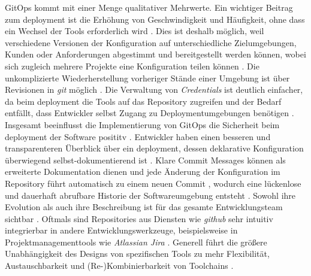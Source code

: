 GitOps kommt mit einer Menge qualitativer Mehrwerte. Ein wichtiger Beitrag zum \Gls{deployment} ist die Erhöhung von Geschwindigkeit und Häufigkeit, ohne dass ein Wechsel der Tools erforderlich wird \cite{008:GitOps-Approach-to-Cloud-Cluster-System-Deployment,109:GitOps}. Dies ist deshalb möglich, weil verschiedene Versionen der Konfiguration auf unterschiedliche Zielumgebungen, Kunden oder Anforderungen abgestimmt und bereitgestellt werden können, wobei sich zugleich mehrere Projekte eine Konfiguration teilen können \cite{008:GitOps-Approach-to-Cloud-Cluster-System-Deployment}. Die unkomplizierte Wiederherstellung vorheriger Stände einer Umgebung ist über Revisionen in \textit{\Gls{git}} möglich \cite{008:GitOps-Approach-to-Cloud-Cluster-System-Deployment,010:Efficient-Application-Deployment-GitOps-for-Faster-and-Secure-CI-CD-Cycles,109:GitOps}. Die Verwaltung von \textit{Credentials} ist deutlich einfacher, da beim \Gls{deployment} die Tools auf das Repository zugreifen \cite{008:GitOps-Approach-to-Cloud-Cluster-System-Deployment,109:GitOps} und der Bedarf entfällt, dass Entwickler selbst Zugang zu Deploymentumgebungen benötigen \cite{010:Efficient-Application-Deployment-GitOps-for-Faster-and-Secure-CI-CD-Cycles}. Insgesamt beeinflusst die Implementierung von GitOps die Sicherheit beim \Gls{deployment} der Software posititv \cite{008:GitOps-Approach-to-Cloud-Cluster-System-Deployment,010:Efficient-Application-Deployment-GitOps-for-Faster-and-Secure-CI-CD-Cycles,109:GitOps}. Entwickler haben einen besseren und transparenteren Überblick über ein \Gls{deployment}, dessen deklarative Konfiguration überwiegend selbst-dokumentierend ist \cite{008:GitOps-Approach-to-Cloud-Cluster-System-Deployment,109:GitOps}. Klare Commit Messages können als erweiterte Dokumentation dienen \cite{008:GitOps-Approach-to-Cloud-Cluster-System-Deployment} und jede Änderung der Konfiguration im Repository führt automatisch zu einem neuen Commit \cite{010:Efficient-Application-Deployment-GitOps-for-Faster-and-Secure-CI-CD-Cycles}, wodurch eine lückenlose und dauerhaft abrufbare Historie der Softwareumgebung entsteht \cite{008:GitOps-Approach-to-Cloud-Cluster-System-Deployment,010:Efficient-Application-Deployment-GitOps-for-Faster-and-Secure-CI-CD-Cycles,109:GitOps}. Sowohl ihre Evolution als auch ihre Beschreibung ist für das gesamte Entwicklungsteam sichtbar \cite{109:GitOps}. Oftmals sind Repositories aus Diensten wie \textit{\Gls{github}} sehr intuitiv integrierbar in andere Entwicklungswerkzeuge, beispielsweise in Projektmanagementtools wie \textit{Atlassian Jira} \cite{008:GitOps-Approach-to-Cloud-Cluster-System-Deployment}. Generell führt die größere Unabhängigkeit des Designs von spezifischen Tools zu mehr Flexibilität, Austauschbarkeit und (Re-)Kombinierbarkeit von Toolchains \cite{010:Efficient-Application-Deployment-GitOps-for-Faster-and-Secure-CI-CD-Cycles}.

